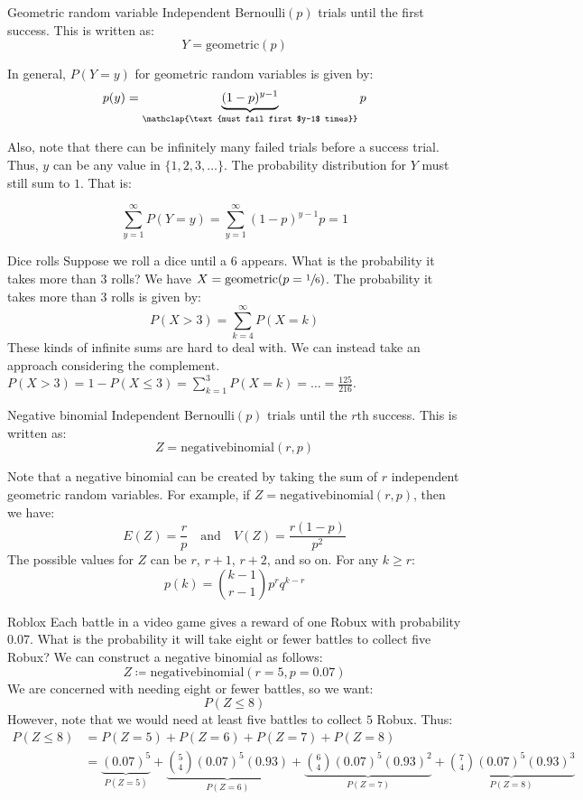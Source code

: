 \begin{dfnbox}{Geometric random variable}{}
    Independent Bernoulli$(p)$ trials until the first success. This is written as:
    \[ Y = \text{geometric}(p) \]
\end{dfnbox}

In general, $P(Y=y)$ for geometric random variables is given by:
\[ p(y) = \underbrace{(1-p)^{y-1}}_{\mathclap{\text{must fail first $y-1$ times}}} p \]

Also, note that there can be infinitely many failed trials before a success trial. Thus, $y$ can be any value in $\{1,2,3,\ldots\}$. The probability distribution for $Y$ must still sum to $1$. That is:

\[ \sum_{y=1}^{\infty} P(Y = y) = \sum_{y=1}^{\infty} (1-p)^{y-1} p = 1 \]

\begin{exbox}{Dice rolls}{}
    Suppose we roll a dice until a $6$ appears. What is the probability it takes more than $3$ rolls?
    \tcblower
    We have $X = \text{geometric}(p=\sfrac16)$. The probability it takes more than $3$ rolls is given by:
    \[ P(X>3) = \sum_{k=4}^{\infty} P(X=k) \]
    These kinds of infinite sums are hard to deal with. We can instead take an approach considering the complement.
    $P(X>3) = 1 - P(X \leq 3) = \sum_{k=1}^{3} P(X=k) = \ldots = \frac{125}{216}$.
\end{exbox}

\begin{dfnbox}{Negative binomial}{}
    Independent Bernoulli$(p)$ trials until the $r$th success. This is written as:
    \[ Z = \text{negativebinomial}(r,p) \]
\end{dfnbox}

Note that a negative binomial can be created by taking the sum of $r$ independent geometric random variables. For example, if $Z = \text{negativebinomial}(r,p)$, then we have:
\[ E(Z) = \frac{r}{p} \quad \text{and} \quad V(Z) = \frac{r(1-p)}{p^2} \]
The possible values for $Z$ can be $r$, $r+1$, $r+2$, and so on. For any $k \geq r$:
\[ p(k) = \binom{k-1}{r-1}p^r q^{k-r} \]

\begin{exbox}{Roblox}{}
    Each battle in a video game gives a reward of one Robux with probability 0.07. What is the probability it will take eight or fewer battles to collect five Robux?
    \tcblower
    We can construct a negative binomial as follows:
    \[ Z \coloneq \text{negativebinomial}(r=5, p=0.07) \]
    We are concerned with needing eight or fewer battles, so we want:
    \[ P(Z \leq 8) \]
    However, note that we would need at least five battles to collect $5$ Robux. Thus:
    \begin{align*}
        P(Z \leq 8)
        &= P(Z=5) + P(Z=6) + P(Z=7) + P(Z=8) \\
        &= \underbrace{(0.07)^5}_{P(Z=5)} + \underbrace{\binom{5}{4}(0.07)^5 (0.93)}_{P(Z=6)} + \underbrace{\binom{6}{4} (0.07)^5 (0.93)^2}_{P(Z=7)} + \underbrace{\binom{7}{4}(0.07)^5(0.93)^3}_{P(Z=8)}
    \end{align*}


\end{exbox}
